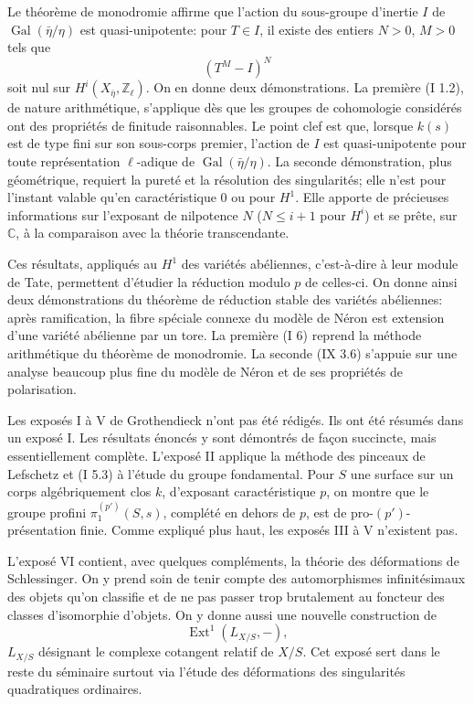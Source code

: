 \documentclass[11pt]{article}
\providecommand{\Gal}{\operatorname{Gal}}
\providecommand{\Zl}{\mathbb Z_\ell}
\begin{document}
Le théorème de monodromie affirme que l'action du sous-groupe d'inertie $I$ de $\Gal(\bar\eta/\eta)$ est quasi-unipotente: pour $T\in I$, il existe des entiers $N>0$, $M>0$ tels que
\[
(T^M-I)^N
\]
soit nul sur $H^i(X_{\bar\eta},\Zl)$. On en donne deux démonstrations. La première (I 1.2), de nature arithmétique, s'applique dès que les groupes de cohomologie considérés ont des propriétés de finitude raisonnables. Le point clef est que, lorsque $k(s)$ est de type fini sur son sous-corps premier, l'action de $I$ est quasi-unipotente pour toute représentation $\ell$-adique de $\Gal(\bar\eta/\eta)$. La seconde démonstration, plus géométrique, requiert la pureté et la résolution des singularités; elle n'est pour l'instant valable qu'en caractéristique $0$ ou pour $H^1$. Elle apporte de précieuses informations sur l'exposant de nilpotence $N$ ($N\le i+1$ pour $H^i$) et se prête, sur $\mathbb C$, à la comparaison avec la théorie transcendante.

Ces résultats, appliqués au $H^1$ des variétés abéliennes, c'est-à-dire à leur module de Tate, permettent d'étudier la réduction modulo $p$ de celles-ci. On donne ainsi deux démonstrations du théorème de réduction stable des variétés abéliennes: après ramification, la fibre spéciale connexe du modèle de Néron est extension d'une variété abélienne par un tore. La première (I 6) reprend la méthode arithmétique du théorème de monodromie. La seconde (IX 3.6) s'appuie sur une analyse beaucoup plus fine du modèle de Néron et de ses propriétés de polarisation.

Les exposés I à V de Grothendieck n'ont pas été rédigés. Ils ont été résumés dans un exposé I. Les résultats énoncés y sont démontrés de façon succincte, mais essentiellement complète. L'exposé II applique la méthode des pinceaux de Lefschetz et (I 5.3) à l'étude du groupe fondamental. Pour $S$ une surface sur un corps algébriquement clos $k$, d'exposant caractéristique $p$, on montre que le groupe profini $\pi_1^{(p')}(S,s)$, complété en dehors de $p$, est de pro-$(p')$-présentation finie. Comme expliqué plus haut, les exposés III à V n'existent pas.

L'exposé VI contient, avec quelques compléments, la théorie des déformations de Schlessinger. On y prend soin de tenir compte des automorphismes infinitésimaux des objets qu'on classifie et de ne pas passer trop brutalement au foncteur des classes d'isomorphie d'objets. On y donne aussi une nouvelle construction de
\[
\operatorname{Ext}^1(L_{X/S},-),
\]
$L_{X/S}$ désignant le complexe cotangent relatif de $X/S$. Cet exposé sert dans le reste du séminaire surtout via l'étude des déformations des singularités quadratiques ordinaires.
\end{document}

